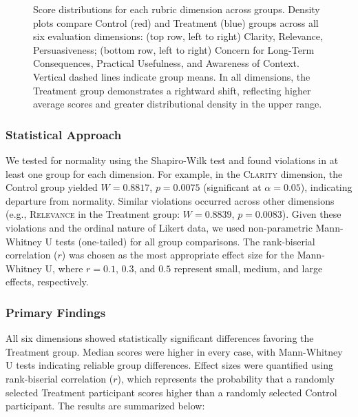 \begin{figure}[t]
  \caption{
    Score distributions for each rubric dimension across groups.
    Density plots compare Control (red) and Treatment (blue) groups across all six evaluation dimensions: (top row, left to right) Clarity, Relevance, Persuasiveness; (bottom row, left to right) Concern for Long-Term Consequences, Practical Usefulness, and Awareness of Context. Vertical dashed lines indicate group means. In all dimensions, the Treatment group demonstrates a rightward shift, reflecting higher average scores and greater distributional density in the upper range.
  }
  \label{fig:distributions}
\end{figure}

\subsubsection*{Statistical Approach}

We tested for normality using the Shapiro-Wilk test and found violations in at least one group for each dimension. For example, in the \textsc{Clarity} dimension, the Control group yielded $W = 0.8817$, $p = 0.0075$ (significant at $\alpha = 0.05$), indicating departure from normality. Similar violations occurred across other dimensions (e.g., \textsc{Relevance} in the Treatment group: $W = 0.8839$, $p = 0.0083$). Given these violations and the ordinal nature of Likert data, we used non-parametric Mann-Whitney U tests (one-tailed) for all group comparisons.
The rank-biserial correlation ($r$) was chosen as the most appropriate effect size for the Mann-Whitney U, where $r = 0.1$, $0.3$, and $0.5$ represent small, medium, and large effects, respectively.

\subsubsection*{Primary Findings}

All six dimensions showed statistically significant differences favoring the Treatment group. Median scores were higher in every case, with Mann-Whitney U tests indicating reliable group differences. Effect sizes were quantified using rank-biserial correlation ($r$), which represents the probability that a randomly selected Treatment participant scores higher than a randomly selected Control participant.
The results are summarized below:

